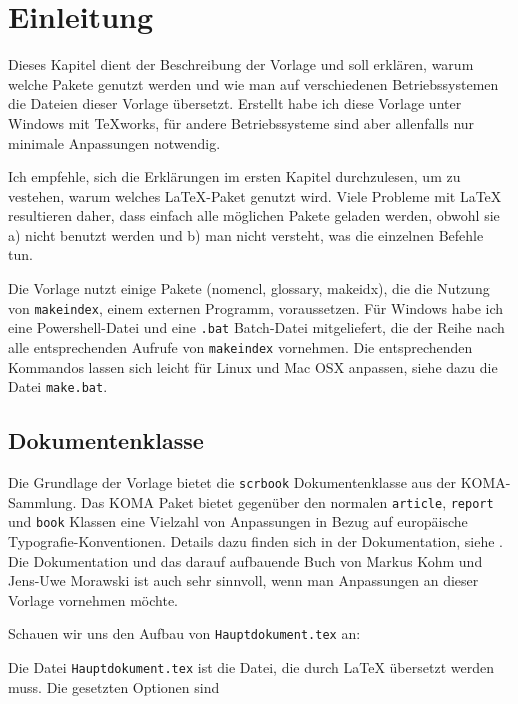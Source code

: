 \chapter{Einleitung}

Dieses Kapitel dient der Beschreibung der Vorlage und soll erklären, warum welche Pakete genutzt werden und wie man auf verschiedenen Betriebssystemen die Dateien dieser Vorlage übersetzt. Erstellt habe ich diese Vorlage unter Windows mit TeXworks, für andere Betriebssysteme sind aber allenfalls nur minimale Anpassungen notwendig. 

Ich empfehle, sich die Erklärungen im ersten Kapitel durchzulesen, um zu vestehen, warum welches \LaTeX-Paket genutzt wird. Viele Probleme mit \LaTeX\xspace resultieren daher, dass einfach alle möglichen Pakete geladen werden, obwohl sie a) nicht benutzt werden und b) man nicht versteht, was die einzelnen Befehle tun. 

Die Vorlage nutzt einige Pakete (nomencl, glossary, makeidx), die die Nutzung von \texttt{makeindex}, einem externen Programm, voraussetzen. Für Windows habe ich eine Powershell-Datei und eine \texttt{.bat} Batch-Datei mitgeliefert, die der Reihe nach alle entsprechenden Aufrufe von \texttt{makeindex} vornehmen. Die entsprechenden Kommandos lassen sich leicht für Linux und Mac OSX anpassen, siehe dazu die Datei \texttt{make.bat}.



\section{Dokumentenklasse}

Die Grundlage der Vorlage bietet die \texttt{scrbook} Dokumentenklasse aus der KOMA-Sammlung. Das KOMA Paket bietet gegenüber den normalen \texttt{article}, \texttt{report} und \texttt{book} Klassen eine Vielzahl von Anpassungen in Bezug auf europäische Typografie-Konventionen. Details dazu finden sich in der Dokumentation, siehe \cite{koma}. Die Dokumentation und das darauf aufbauende Buch von Markus Kohm und Jens-Uwe Morawski ist auch sehr sinnvoll, wenn man Anpassungen an dieser Vorlage vornehmen möchte. 

Schauen wir uns den Aufbau von \texttt{Hauptdokument.tex} an:



Die Datei \texttt{Hauptdokument.tex} ist die Datei, die durch \LaTeX\xspace übersetzt werden muss. Die gesetzten Optionen sind

